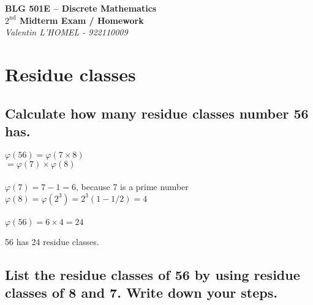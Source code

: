 \documentclass{article}
\begin{document}
\begin{center}
    \LARGE\textbf{BLG 501E – Discrete Mathematics}\\
    \vspace{1em}
    \Large\textbf{$\text{2}^{\text{nd}}$ Midterm Exam / Homework}\\
    \large\textit{Valentin L'HOMEL - 922110009}
\end{center}

\section{Residue classes}
\subsection{Calculate how many residue classes number 56 has.}

\begin{adjustwidth}{2em}{}
    $\varphi(56) = \varphi(7\times8)$\\
    \hspace*{2.7em}$= \varphi(7)\times\varphi(8)$\\
    \vspace{-0.5em}\\
    $\varphi(7) = 7-1 = 6$, because 7 is a prime number\\
    $\varphi(8) = \varphi(2^3) = 2^3(1-1/2) = 4$\\
    \vspace{-0.5em}\\
    $\varphi(56) = 6\times4 = 24$
\end{adjustwidth}

\vspace*{0.5em}\hspace*{-1.5em}56 has 24 residue classes.

\subsection{List the residue classes of 56 by using residue classes of 8 and 7. Write down your steps.}
\end{document}
